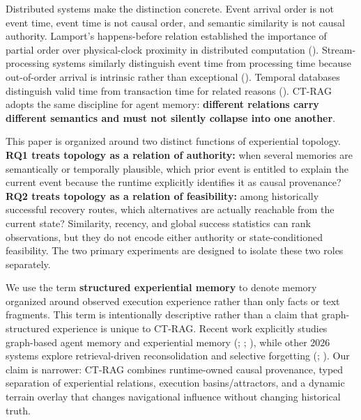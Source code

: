 \documentclass[
  11pt,
]{article}
\begin{document}
Distributed systems make the distinction concrete. Event arrival order
is not event time, event time is not causal order, and semantic
similarity is not causal authority. Lamport's happens-before relation
established the importance of partial order over physical-clock
proximity in distributed computation
(). Stream-processing
systems similarly distinguish event time from processing time because
out-of-order arrival is intrinsic rather than exceptional
(). Temporal
databases distinguish valid time from transaction time for related
reasons ().
CT-RAG adopts the same discipline for agent memory: \textbf{different
relations carry different semantics and must not silently collapse into
one another}.

This paper is organized around two distinct functions of experiential
topology. \textbf{RQ1 treats topology as a relation of authority:} when
several memories are semantically or temporally plausible, which prior
event is entitled to explain the current event because the runtime
explicitly identifies it as causal provenance? \textbf{RQ2 treats
topology as a relation of feasibility:} among historically successful
recovery routes, which alternatives are actually reachable from the
current state? Similarity, recency, and global success statistics can
rank observations, but they do not encode either authority or
state-conditioned feasibility. The two primary experiments are designed
to isolate these two roles separately.

We use the term \textbf{structured experiential memory} to denote memory
organized around observed execution experience rather than only facts or
text fragments. This term is intentionally descriptive rather than a
claim that graph-structured experience is unique to CT-RAG. Recent work
explicitly studies graph-based agent memory and experiential memory
(;
;
), while other 2026 systems
explore retrieval-driven reconsolidation and selective forgetting
(;
). Our
claim is narrower: CT-RAG combines runtime-owned causal provenance,
typed separation of experiential relations, execution basins/attractors,
and a dynamic terrain overlay that changes navigational influence
without changing historical truth.
\end{document}
